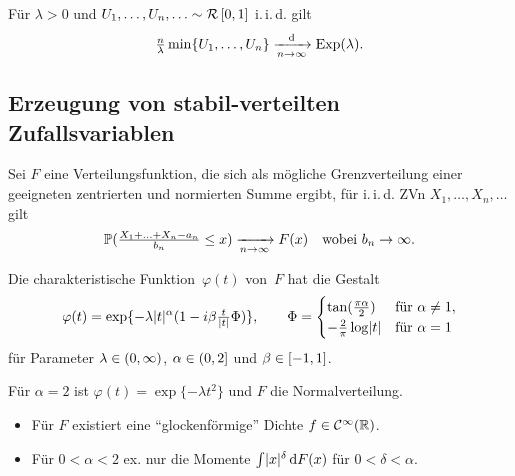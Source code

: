 \documentclass{cheat-sheet}
\renewcommand{\P}{\mathbb{P}} %
\newcommand{\Cont}{\mathcal{C}} %
\newcommand{\iid}{i.\,i.\,d.} %
\newcommand{\Uniform}{\mathcal{R}} %
\DeclareMathOperator{\Exp}{Exp} %
\begin{document}
\begin{satz}
  Für $\lambda > 0$ und $U_1, \ldots, U_n, \ldots \sim \Uniform \cinterval{0}{1}$ \iid{} gilt
  \[
    \tfrac{n}{\lambda} \min \{ U_1, \ldots, U_n \} \xra[n \to \infty]{\d} \Exp(\lambda).
  \]
\end{satz}

\subsection{Erzeugung von stabil-verteilten Zufallsvariablen}

Sei $F$ eine Verteilungsfunktion, die sich als mögliche Grenzverteilung einer geeigneten zentrierten und normierten Summe ergibt, \dh{} für \iid{} ZVn $X_1, \ldots, X_n, \ldots$ gilt
\[
  \P(\tfrac{X_1 + \ldots + X_n - a_n}{b_n} \leq x) \xra[n \to \infty]{} F(x)
  \quad \text{wobei $b_n \to \infty$}.
\]

\begin{satz}
  Die charakteristische Funktion~$\varphi(t)$ von~$F$ hat die Gestalt
  \[
    \varphi(t) = \exp \{ - \lambda \lvert t\rvert^\alpha (1 - i \beta \tfrac{t}{\lvert t\rvert} \Phi) \}, \qquad
    \Phi = \begin{cases}
      \tan(\tfrac{\pi \alpha}{2}) & \text{für } \alpha \neq 1, \\
      - \tfrac{2}{\pi} \log \lvert t\rvert & \text{für } \alpha = 1
    \end{cases}
  \]
  für Parameter $\lambda \in \left( 0, \infty \right)$, $\alpha \in \left( 0, 2 \right]$ und $\beta \in \left[ -1, 1 \right]$.
\end{satz}

\begin{bsp}
  Für $\alpha = 2$ ist $\varphi(t) = \exp \{ - \lambda t^2 \}$ und $F$ die Normalverteilung.
\end{bsp}

\begin{bemn}
  \begin{itemize}
    \item Für $F$ existiert eine "`glockenförmige"' Dichte $f \in \Cont^\infty(\R)$.
    \item Für $0 < \alpha < 2$ ex. nur die Momente ${\textstyle \int} \lvert x\rvert^\delta \,\mathrm{d} F(x)$ für $0 < \delta < \alpha$.
  \end{itemize}
\end{bemn}


\end{document}

